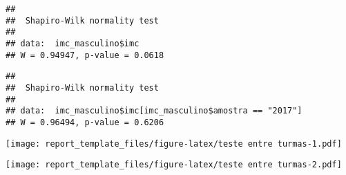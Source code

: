 \documentclass[
]{article}
\newenvironment{Shaded}{\begin{snugshade}}{\end{snugshade}}
\newcommand{\FunctionTok}[1]{\textcolor[rgb]{0.13,0.29,0.53}{\textbf{#1}}}
\newcommand{\NormalTok}[1]{#1}
\newcommand{\SpecialCharTok}[1]{\textcolor[rgb]{0.81,0.36,0.00}{\textbf{#1}}}
\newcommand{\StringTok}[1]{\textcolor[rgb]{0.31,0.60,0.02}{#1}}
\begin{document}
\begin{verbatim}
## 
##  Shapiro-Wilk normality test
## 
## data:  imc_masculino$imc
## W = 0.94947, p-value = 0.0618
\end{verbatim}

\begin{Shaded}
\end{Shaded}

\begin{verbatim}
## 
##  Shapiro-Wilk normality test
## 
## data:  imc_masculino$imc[imc_masculino$amostra == "2017"]
## W = 0.96494, p-value = 0.6206
\end{verbatim}

\begin{Shaded}
\end{Shaded}

\texttt{[image: report\_template\_files/figure-latex/teste entre turmas-1.pdf]}

\begin{Shaded}
\end{Shaded}

\texttt{[image: report\_template\_files/figure-latex/teste entre turmas-2.pdf]}

\begin{Shaded}
\end{Shaded}
\end{document}
